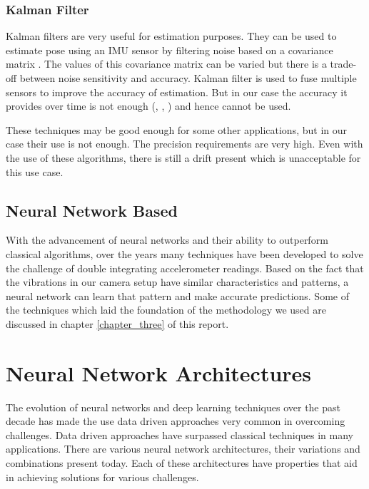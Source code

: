 \subsubsection{Kalman Filter}
Kalman filters are very useful for estimation purposes. They can be used to estimate pose using an IMU sensor by filtering noise based on a covariance matrix \citep{ferdinando2012embedded}. The values of this covariance matrix can be varied but there is a trade-off between noise sensitivity and accuracy. Kalman filter is used to fuse multiple sensors to improve the accuracy of estimation. But in our case the accuracy it provides over time is not enough (\citep{kok2017using}, \citep{alatise2017pose}, \citep{bangera2020mems}) and hence cannot be used.

These techniques may be good enough for some other applications, but in our case their use is not enough. The precision requirements are very high. Even with the use of these algorithms, there is still a drift present which is unacceptable for this use case.

\subsection{Neural Network Based}
With the advancement of neural networks and their ability to outperform classical algorithms, over the years many techniques have been developed to solve the challenge of double integrating accelerometer readings. Based on the fact that the vibrations in our camera setup have similar characteristics and patterns, a neural network can learn that pattern and make accurate predictions. Some of the techniques which laid the foundation of the methodology we used are discussed in chapter \ref{chapter_three} of this report.


\section{Neural Network Architectures}
The evolution of neural networks and deep learning techniques over the past decade has made the use data driven approaches very common in overcoming challenges. Data driven approaches have surpassed classical techniques in many applications. There are various neural network architectures, their variations and combinations present today. Each of these architectures have properties that aid in achieving solutions for various challenges.

